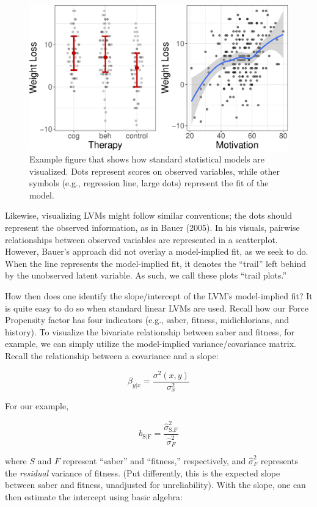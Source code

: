 \documentclass[
  english,
  doc]{apa6}
\begin{document}
\begin{figure}
\centering
\includegraphics{flexplavaan_draft_files/figure-latex/scatter-1.pdf}
\caption{\label{fig:scatter}Example figure that shows how standard statistical models are visualized. Dots represent scores on observed variables, while other symbols (e.g., regression line, large dots) represent the fit of the model.}
\end{figure}

Likewise, visualizing LVMs might follow similar conventions; the dots should represent the observed information, as in Bauer (2005). In his visuals, pairwise relationships between observed variables are represented in a scatterplot. However, Bauer's approach did not overlay a model-implied fit, as we seek to do. When the line represents the model-implied fit, it denotes the ``trail'' left behind by the unobserved latent variable. As such, we call these plots ``trail plots.''

How then does one identify the slope/intercept of the LVM's model-implied fit? It is quite easy to do so when standard linear LVMs are used. Recall how our Force Propensity factor has four indicators (e.g., saber, fitness, midichlorians, and history). To visualize the bivariate relationship between saber and fitness, for example, we can simply utilize the model-implied variance/covariance matrix. Recall the relationship between a covariance and a slope:

\[\beta_{y|x} = \frac{\sigma^2(x,y)}{\sigma^2_x}\]

For our example,

\[b_{\text{S}|\text{F}} = \frac{\hat{\sigma}^2_{\text{S},\text{F}}}{\hat{\sigma}^2_F}\]

where \(S\) and \(F\) represent ``saber'' and ``fitness,'' respectively, and \({\hat{\sigma}^2_F}\) represents the \emph{residual} variance of fitness. (Put differently, this is the expected slope between saber and fitness, unadjusted for unreliability). With the slope, one can then estimate the intercept using basic algebra:
\end{document}
